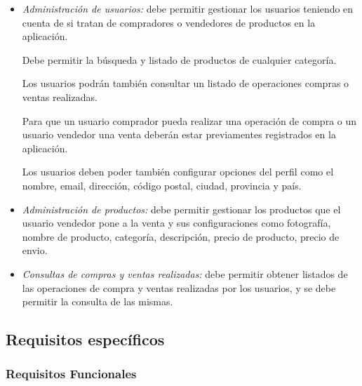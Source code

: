   \begin{itemize}
  
  \item \emph{Administración de usuarios:} debe permitir gestionar los usuarios teniendo en cuenta de si tratan de compradores o vendedores de productos en la aplicación.

    Debe permitir la búsqueda y listado de productos de cualquier categoría.

    Los usuarios podrán también consultar un listado de operaciones compras o ventas realizadas.
    
    Para que un usuario comprador pueda realizar una operación de compra o un usuario vendedor una venta deberán estar previamentes registrados en la aplicación.

    Los usuarios deben poder también configurar opciones del perfil como el nombre, email, dirección, código postal, ciudad, provincia y país.
  
  \item \emph{Administración de productos:} debe permitir gestionar los productos que el usuario vendedor pone a la venta y sus configuraciones como fotografía, nombre de producto, categoría, descripción, precio de producto, precio de envio.
  
  \item \emph{Consultas de compras y ventas realizadas:} debe permitir obtener listados de las operaciones de compra y ventas realizadas por los usuarios, y se debe permitir la consulta de las mismas.
  
  \end{itemize}

 \subsection{Requisitos específicos}
        \subsubsection{Requisitos Funcionales}
        
